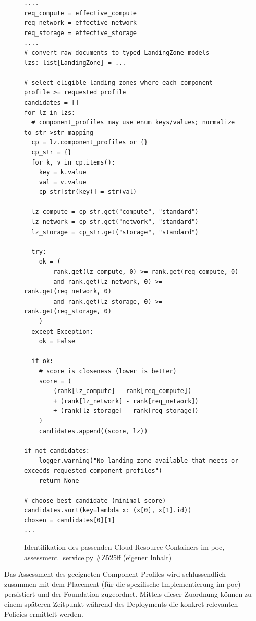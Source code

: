 \begin{figure}[H]
\centering
\begin{verbatim}
....
req_compute = effective_compute
req_network = effective_network
req_storage = effective_storage
....
# convert raw documents to typed LandingZone models
lzs: list[LandingZone] = ...

# select eligible landing zones where each component profile >= requested profile
candidates = []
for lz in lzs:
  # component_profiles may use enum keys/values; normalize to str->str mapping
  cp = lz.component_profiles or {}
  cp_str = {}
  for k, v in cp.items():
    key = k.value
    val = v.value
    cp_str[str(key)] = str(val)

  lz_compute = cp_str.get("compute", "standard")
  lz_network = cp_str.get("network", "standard")
  lz_storage = cp_str.get("storage", "standard")

  try:
    ok = (
        rank.get(lz_compute, 0) >= rank.get(req_compute, 0)
        and rank.get(lz_network, 0) >= rank.get(req_network, 0)
        and rank.get(lz_storage, 0) >= rank.get(req_storage, 0)
    )
  except Exception:
    ok = False

  if ok:
    # score is closeness (lower is better)
    score = (
        (rank[lz_compute] - rank[req_compute])
        + (rank[lz_network] - rank[req_network])
        + (rank[lz_storage] - rank[req_storage])
    )
    candidates.append((score, lz))

if not candidates:
    logger.warning("No landing zone available that meets or exceeds requested component profiles")
    return None

# choose best candidate (minimal score)
candidates.sort(key=lambda x: (x[0], x[1].id))
chosen = candidates[0][1]
...
\end{verbatim}
\caption{Identifikation des passenden Cloud Resource Containers im \ac{poc}, assessment\_service.py \#Z525ff (eigener Inhalt)}
\label{fig:landing-zone-algorithm}
\end{figure}

Das Assessment des geeigneten Component-Profiles wird schlussendlich zusammen mit dem Placement (für die spezifische Implementierung im \ac{poc}) persistiert und der Foundation zugeordnet. Mittels dieser Zuordnung können zu einem späteren Zeitpunkt während des Deployments die konkret relevanten Policies ermittelt werden.

